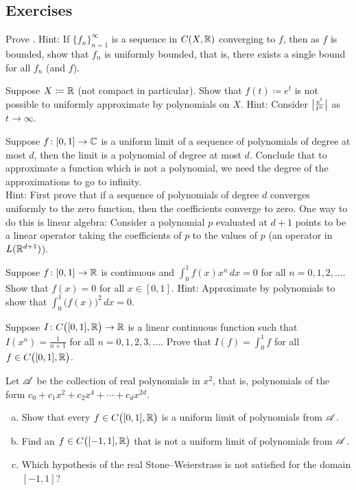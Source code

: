 \subsection{Exercises}

\begin{exercise}
Prove .
Hint: If $\{ f_n \}_{n=1}^\infty$ is a sequence in $C(X,{\mathbb{R}})$
converging to $f$, then as $f$ is bounded, show
that $f_n$ is uniformly bounded, that is, there exists a
single bound for all $f_n$ (and $f$).
\end{exercise}

\begin{exercise}
Suppose $X \coloneqq {\mathbb{R}}$ (not compact in particular).
Show that $f(t) \coloneqq e^t$ is not possible to uniformly approximate
by polynomials on $X$.  Hint: Consider $\bigl\lvert {\frac{e^t}{t^n}} \bigr\rvert$
as $t \to \infty$.
\end{exercise}

\begin{exercise}
Suppose $f \colon [0,1] \to {\mathbb{C}}$ is a uniform limit of a sequence of polynomials
of degree at most $d$, then the limit is a polynomial of degree at most $d$.
Conclude that to approximate a function which is not a polynomial, we
need the degree of the approximations to go to infinity.\\
Hint: First prove that if a sequence of polynomials of degree $d$
converges uniformly to the zero function, then 
the coefficients converge to zero.
One way to do this is linear algebra: Consider a polynomial $p$
evaluated at $d+1$ points
to be a linear operator taking the
coefficients of $p$ to the values of $p$
(an operator in $L({\mathbb{R}}^{d+1})$).
\end{exercise}

\begin{exercise}
Suppose $f \colon [0,1] \to {\mathbb{R}}$ is continuous and
$\int_0^1 f(x) x^n \, dx = 0$ for all $n = 0,1,2,\ldots$.
Show that $f(x) = 0$ for all $x \in [0,1]$.
Hint: Approximate by polynomials to show that $\int_0^1 {\bigl( f(x)
\bigr)}^2 \, dx = 0$.
\end{exercise}

\begin{exercise}
Suppose $I \colon C\bigl([0,1],{\mathbb{R}}\bigr) \to {\mathbb{R}}$ is 
a linear continuous function such that
$I(x^n) = \frac{1}{n+1}$
for all $n=0,1,2,3,\ldots$.
Prove that $I(f) = \int_0^1 f$ for all $f \in C\bigl([0,1],{\mathbb{R}}\bigr)$.
\end{exercise}

\begin{exercise}
Let ${\mathscr{A}}$ be the collection of real polynomials in $x^2$,
that is, polynomials of the form
$c_0 + c_1 x^2 + c_2 x^4 + \cdots + c_d x^{2d}$.
\begin{enumerate}[a)]
\item
Show that every $f \in C\bigl([0,1],{\mathbb{R}}\bigr)$ is a uniform limit of
polynomials from ${\mathscr{A}}$.
\item
Find an $f \in  C\bigl([-1,1],{\mathbb{R}}\bigr)$ that is not a
uniform limit of
polynomials from ${\mathscr{A}}$.
\item
Which hypothesis of the real Stone--Weierstrass is not satisfied
for the domain $[-1,1]$?
\end{enumerate}
\end{exercise}

